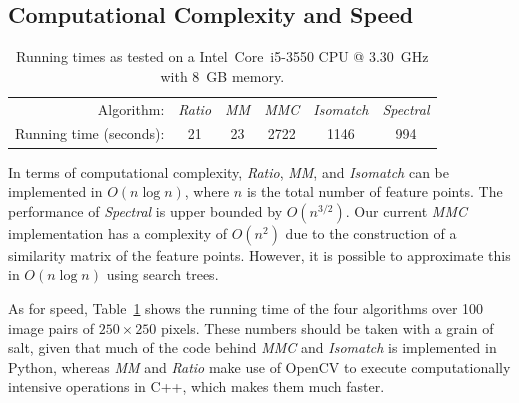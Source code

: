 \subsection{Computational Complexity and Speed}

\begin{table}[htb]
\caption{Running times as tested on a Intel\textregistered\ Core\texttrademark\ i5-3550 CPU @ 
3.30~GHz with 8~GB memory.}
\label{table:running_times}
	\centering
\begin{tabular}{r*{5}{c}}
\hline
	Algorithm: & \emph{Ratio} & \emph{MM} & \emph{MMC} %
& \emph{Isomatch} & \emph{Spectral}	\\
	\noalign{\smallskip} 
	Running time (seconds): & 21 & 23 & 2722 & 1146 & 994\\
	\hline
\end{tabular}
\end{table}
In terms of computational complexity, \emph{Ratio}, \emph{MM}, and 
\emph{Isomatch} can be implemented in $O(n\log n)$, where $n$ is the 
total number of feature points. The performance of \emph{Spectral} is 
upper bounded by $O(n^{3/2})$. Our current \emph{MMC} implementation has 
a complexity of $O(n^2)$ due to the construction of a similarity matrix 
of the feature points.  However, it is possible to approximate this in 
$O(n\log n)$ using search trees.  

As for speed, Table~\ref{table:running_times} shows the running time of 
the four algorithms over 100 image pairs of $250\!\times\!250$ pixels.  
These numbers should be taken with a grain of salt, given that much of 
the code behind \emph{MMC} and \emph{Isomatch} is implemented in Python, 
whereas \emph{MM} and \emph{Ratio} make use of OpenCV to execute 
computationally intensive operations in C++, which makes them much 
faster. 


